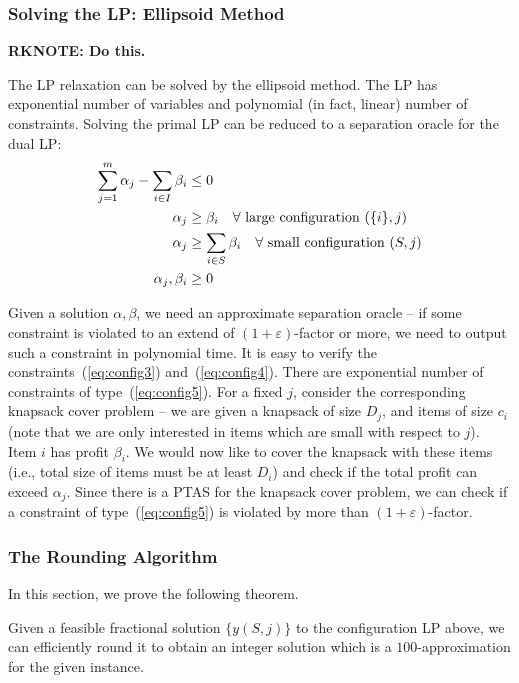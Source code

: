 \subsubsection{Solving the LP: Ellipsoid Method}
{\bf RKNOTE: Do this.}

The LP relaxation can be solved by the ellipsoid method. The LP has exponential number of variables and polynomial (in fact, linear) number of
constraints. Solving the primal LP  can be reduced to
a separation oracle for the dual LP:
\begin{align}
\label{eq:config3}
 \sum_{j=1}^m \alpha_j - \sum_{i \in I} \beta_i & \leq 0 \\
\label{eq:config4}
\alpha_j & \geq  \beta_i \ \ \ \forall \ {\mbox{large configuration $(\{i\}, j)$}} \\
\label{eq:config5}
\alpha_j & \geq  \sum_{i \in S} \beta_i \ \ \ \forall \ {\mbox{small configuration $(S, j)$}} \\
\notag
\alpha_j, \beta_i & \geq 0
\end{align}


Given a solution $\alpha, \beta$, we need an approximate separation oracle -- if some constraint is violated to an extend of $(1+\varepsilon)$-factor
or more, we need to output such a constraint in polynomial time. It is easy to verify the constraints~(\ref{eq:config3}) and~(\ref{eq:config4}). There
are exponential number of constraints of type~(\ref{eq:config5}). For a fixed $j$, consider the corresponding knapsack cover problem -- we are given
a knapsack of size $D_j$, and items of size $c_i$ (note that we are only interested in items which are small with respect to $j$). Item $i$ has
profit $\beta_i$. We would now like to cover the knapsack with these items (i.e., total size of items must be at least $D_i$) and check if the total
profit can exceed $\alpha_j$. Since there is a PTAS for the knapsack cover problem, we can check if a constraint of type~(\ref{eq:config5})
is violated by more than $(1+\varepsilon)$-factor.

\subsubsection{The Rounding Algorithm}

In this section, we prove the following theorem.
\begin{theorem} \label{thm:round-conf}
Given a feasible fractional solution $\{y(S,j)\}$ to the configuration LP above, we can efficiently round it to obtain an integer solution which is a $100$-approximation for the given \cckp instance.
\end{theorem}


